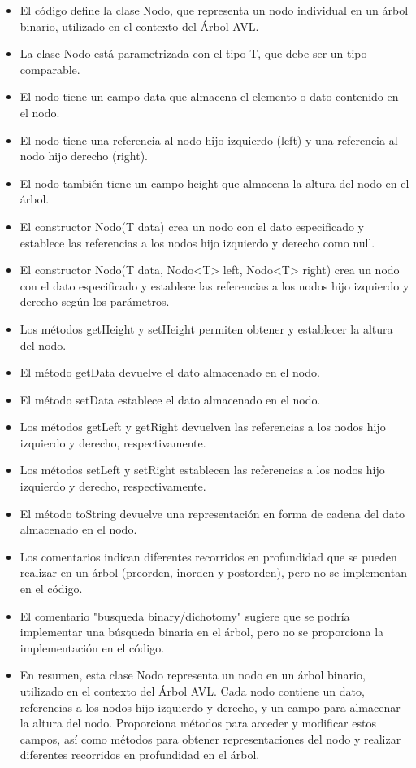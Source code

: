 \documentclass{article}
\begin{document}
	\begin{itemize}
		\item El código define la clase Nodo, que representa un nodo individual en un árbol binario, utilizado en el contexto del Árbol AVL.
		\item La clase Nodo está parametrizada con el tipo T, que debe ser un tipo comparable.
		\item El nodo tiene un campo data que almacena el elemento o dato contenido en el nodo.
		\item El nodo tiene una referencia al nodo hijo izquierdo (left) y una referencia al nodo hijo derecho (right).
		\item El nodo también tiene un campo height que almacena la altura del nodo en el árbol.
		\item El constructor Nodo(T data) crea un nodo con el dato especificado y establece las referencias a los nodos hijo izquierdo y derecho como null.
		\item El constructor Nodo(T data, Nodo<T> left, Nodo<T> right) crea un nodo con el dato especificado y establece las referencias a los nodos hijo izquierdo y derecho según los parámetros.
		\item Los métodos getHeight y setHeight permiten obtener y establecer la altura del nodo.
		\item El método getData devuelve el dato almacenado en el nodo.
		\item El método setData establece el dato almacenado en el nodo.
		\item Los métodos getLeft y getRight devuelven las referencias a los nodos hijo izquierdo y derecho, respectivamente.
		\item Los métodos setLeft y setRight establecen las referencias a los nodos hijo izquierdo y derecho, respectivamente.
		\item El método toString devuelve una representación en forma de cadena del dato almacenado en el nodo.
		\item Los comentarios indican diferentes recorridos en profundidad que se pueden realizar en un árbol (preorden, inorden y postorden), pero no se implementan en el código.
		\item El comentario "busqueda binary/dichotomy" sugiere que se podría implementar una búsqueda binaria en el árbol, pero no se proporciona la implementación en el código.
		\item En resumen, esta clase Nodo representa un nodo en un árbol binario, utilizado en el contexto del Árbol AVL. Cada nodo contiene un dato, referencias a los nodos hijo izquierdo y derecho, y un campo para almacenar la altura del nodo. Proporciona métodos para acceder y modificar estos campos, así como métodos para obtener representaciones del nodo y realizar diferentes recorridos en profundidad en el árbol.
		\end{itemize}
\end{document}
